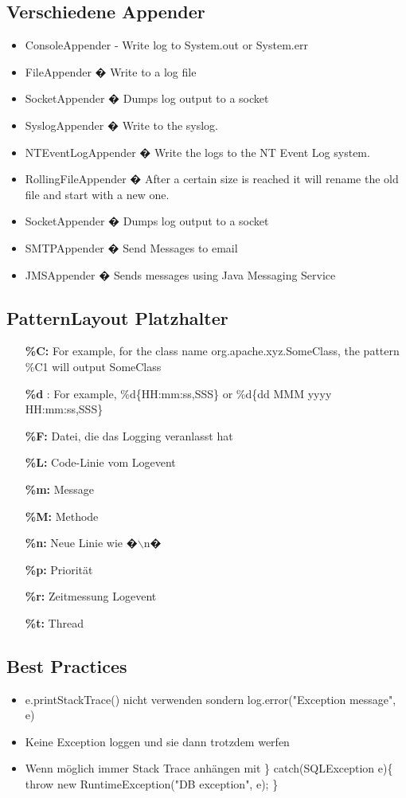 \documentclass[a4paper,10pt]{article}
\newcommand{\Bold}[1]{\textbf{#1}} %
\begin{document}
\subsection{Verschiedene Appender}
\begin{itemize}
\item ConsoleAppender - Write log to System.out or System.err
\item FileAppender � Write to a log file
\item SocketAppender � Dumps log output to a socket
\item SyslogAppender � Write to the syslog.
\item NTEventLogAppender � Write the logs to the NT Event Log system.
\item RollingFileAppender � After a certain size is reached it will rename the old file and start with a new one.
\item SocketAppender � Dumps log output to a socket
\item SMTPAppender � Send Messages to email
\item JMSAppender � Sends messages using Java Messaging Service
\end{itemize}

\subsection{PatternLayout Platzhalter}
\begin{itemize}
\item[\Bold{\%C:}] For example, for the class name org.apache.xyz.SomeClass, the pattern \%C{1} will output SomeClass
\item[\Bold{\%d}]: For example, \%d\{HH:mm:ss,SSS\} or \%d\{dd MMM yyyy HH:mm:ss,SSS\}
\item[\Bold{\%F:}] Datei, die das Logging veranlasst hat
\item[\Bold{\%L:}] Code-Linie vom Logevent
\item[\Bold{\%m:}] Message
\item[\Bold{\%M:}] Methode
\item[\Bold{\%n:}] Neue Linie wie �$\backslash$n�
\item[\Bold{\%p:}] Priorit\"{a}t
\item[\Bold{\%r:}] Zeitmessung Logevent
\item[\Bold{\%t:}] Thread
\end{itemize}

\subsection{Best Practices} 
\begin{itemize}
\item e.printStackTrace() nicht verwenden sondern log.error("Exception message", e)
\item Keine Exception loggen und sie dann trotzdem werfen
\item Wenn m\"{o}glich immer Stack Trace anh\"{a}ngen mit \} catch(SQLException e)\{ 
throw new RuntimeException("DB exception", e); \}
\end{itemize}
\end{document}
